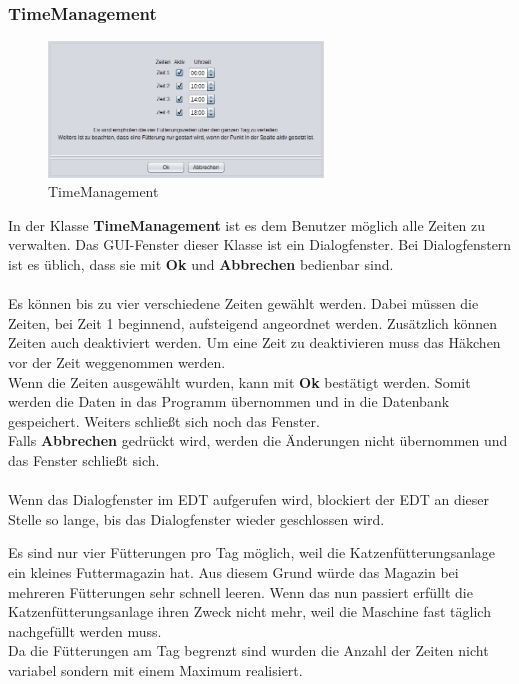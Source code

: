 \subsubsection{TimeManagement}\label{subsubsec:TimeManagement}
\begin{figure}
\vspace{-20pt}
  \begin{center}
    \includegraphics[width=0.65\textwidth]{Bilder/GUI/TimeManagement}
  \end{center}
  \caption{TimeManagement}
  \label{TimeManagement}
  \vspace{0pt}
\end{figure}
In der Klasse \textbf{TimeManagement} ist es dem Benutzer möglich alle Zeiten zu verwalten. Das \ac{GUI}-Fenster dieser Klasse ist ein Dialogfenster. Bei Dialogfenstern ist es üblich, dass sie mit \textbf{Ok} und \textbf{Abbrechen} bedienbar sind.
\\ \\ Es können bis zu vier verschiedene Zeiten gewählt werden. Dabei müssen die Zeiten, bei Zeit 1 beginnend, aufsteigend angeordnet werden. Zusätzlich können Zeiten auch deaktiviert werden. Um eine Zeit zu deaktivieren muss das Häkchen vor der Zeit weggenommen werden.
\\ Wenn die Zeiten ausgewählt wurden, kann mit \textbf{Ok} bestätigt werden. Somit werden die Daten in das Programm übernommen und in die Datenbank gespeichert. Weiters schließt sich noch das Fenster.
\\ Falls \textbf{Abbrechen} gedrückt wird, werden die Änderungen nicht übernommen und das Fenster schließt sich.
\\ \\ Wenn das Dialogfenster im \ac{EDT} aufgerufen wird, blockiert der \ac{EDT} an dieser Stelle so lange, bis das Dialogfenster wieder geschlossen wird.

\vspace{10pt}

Es sind nur vier Fütterungen pro Tag möglich, weil die Katzenfütterungsanlage ein kleines Futtermagazin hat. Aus diesem Grund würde das Magazin bei mehreren Fütterungen sehr schnell leeren. Wenn das nun passiert erfüllt die Katzenfütterungsanlage ihren Zweck nicht mehr, weil die Maschine fast täglich nachgefüllt werden muss.
\\ Da die Fütterungen am Tag begrenzt sind wurden die Anzahl der Zeiten nicht variabel sondern mit einem Maximum realisiert.

